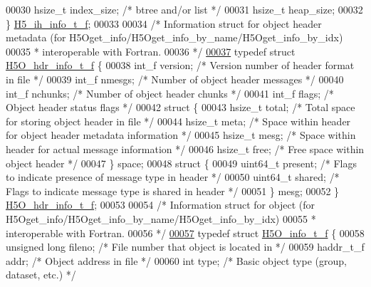 \begin{DoxyCode}
00030     hsize\_t     index\_size;     \textcolor{comment}{/* btree and/or list */}
00031     hsize\_t     heap\_size;
00032 \} \hyperlink{struct_h5__ih__info__t__f}{H5\_ih\_info\_t\_f};
00033 
00034 \textcolor{comment}{/* Information struct for object header metadata (for H5Oget\_info/H5Oget\_info\_by\_name/H5Oget\_info\_by\_idx) }
00035 \textcolor{comment}{ *  interoperable with Fortran.}
00036 \textcolor{comment}{ */}
\hyperlink{struct_h5_o__hdr__info__t__f}{00037} \textcolor{keyword}{typedef} \textcolor{keyword}{struct }\hyperlink{struct_h5_o__hdr__info__t__f}{H5O\_hdr\_info\_t\_f} \{
00038     int\_f version;      \textcolor{comment}{/* Version number of header format in file */}
00039     int\_f nmesgs;       \textcolor{comment}{/* Number of object header messages */}
00040     int\_f nchunks;      \textcolor{comment}{/* Number of object header chunks */}
00041     int\_f flags;                \textcolor{comment}{/* Object header status flags */}
00042     \textcolor{keyword}{struct }\{
00043         hsize\_t total;      \textcolor{comment}{/* Total space for storing object header in file */}
00044         hsize\_t meta;       \textcolor{comment}{/* Space within header for object header metadata information */}
00045         hsize\_t mesg;       \textcolor{comment}{/* Space within header for actual message information */}
00046         hsize\_t free;       \textcolor{comment}{/* Free space within object header */}
00047     \} space;
00048     \textcolor{keyword}{struct }\{
00049         uint64\_t present;   \textcolor{comment}{/* Flags to indicate presence of message type in header */}
00050         uint64\_t shared;    \textcolor{comment}{/* Flags to indicate message type is shared in header */}
00051     \} mesg;
00052 \} \hyperlink{struct_h5_o__hdr__info__t__f}{H5O\_hdr\_info\_t\_f};
00053 
00054 \textcolor{comment}{/* Information struct for object (for H5Oget\_info/H5Oget\_info\_by\_name/H5Oget\_info\_by\_idx) }
00055 \textcolor{comment}{ *  interoperable with Fortran.}
00056 \textcolor{comment}{ */}
\hyperlink{struct_h5_o__info__t__f}{00057} \textcolor{keyword}{typedef} \textcolor{keyword}{struct }\hyperlink{struct_h5_o__info__t__f}{H5O\_info\_t\_f} \{
00058     \textcolor{keywordtype}{unsigned} \textcolor{keywordtype}{long}   fileno;     \textcolor{comment}{/* File number that object is located in */}
00059     haddr\_t\_f       addr;       \textcolor{comment}{/* Object address in file   */}
00060     \textcolor{keywordtype}{int}         type;       \textcolor{comment}{/* Basic object type (group, dataset, etc.) */}

\end{DoxyCode}
